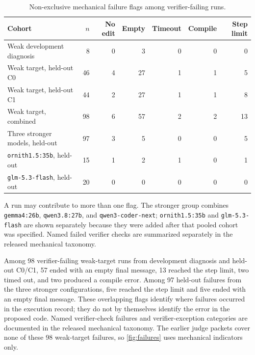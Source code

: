 \documentclass[10pt]{article}
\newcommand{\Gemma}{\texttt{gemma4:\allowbreak 26b}}
\newcommand{\QwenStrong}{\texttt{qwen3.8:\allowbreak 27b}}
\newcommand{\Coder}{\texttt{qwen3-coder-next}}
\newcommand{\Ornith}{\texttt{ornith1.5:\allowbreak 35b}}
\newcommand{\GLM}{\texttt{glm-5.3-flash}}
\begin{document}
\begin{table}[H]
\centering
\footnotesize
\setlength{\tabcolsep}{4pt}
\begin{threeparttable}
\caption{Non-exclusive mechanical failure flags among verifier-failing runs.}
\label{tab:failure}
\begin{tabular}{@{}lrrrrrr@{}}
\toprule
Cohort & \(n\) & No edit & Empty & Timeout & Compile & Step limit \\
\midrule
Weak development diagnosis & 8 & 0 & 3 & 0 & 0 & 0 \\
Weak target, held-out C0 & 46 & 4 & 27 & 1 & 1 & 5 \\
Weak target, held-out C1 & 44 & 2 & 27 & 1 & 1 & 8 \\
Weak target, combined & 98 & 6 & 57 & 2 & 2 & 13 \\
Three stronger models, held-out & 97 & 3 & 5 & 0 & 0 & 5 \\
\Ornith{}, held-out & 15 & 1 & 2 & 1 & 0 & 1 \\
\GLM{}, held-out & 20 & 0 & 0 & 0 & 0 & 0 \\
\bottomrule
\end{tabular}
\begin{tablenotes}[flushleft]\footnotesize
\item A run may contribute to more than one flag. The stronger group combines \Gemma{}, \QwenStrong{}, and \Coder{}; \Ornith{} and \GLM{} are shown separately because they were added after that pooled cohort was specified. Named failed verifier checks are summarized separately in the released mechanical taxonomy.
\end{tablenotes}
\end{threeparttable}
\end{table}

Among 98 verifier-failing weak-target runs from development diagnosis and held-out C0/C1, 57 ended with an empty final message, 13 reached the step limit, two timed out, and two produced a compile error. Among 97 held-out failures from the three stronger configurations, five reached the step limit and five ended with an empty final message. These overlapping flags identify where failures occurred in the execution record; they do not by themselves identify the error in the proposed code. Named verifier-check failures and verifier-exception categories are documented in the released mechanical taxonomy. The earlier judge packets cover none of these 98 weak-target failures, so \cref{fig:failures} uses mechanical indicators only.
\end{document}
